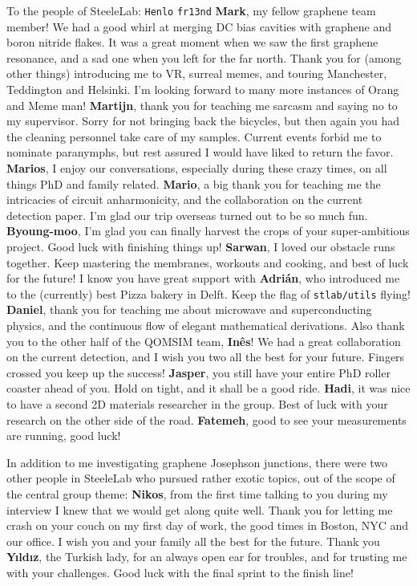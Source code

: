 To the people of SteeleLab:
%
\texttt{Henlo} \texttt{fr13nd} \textbf{Mark}, my fellow graphene team member!
%
We had a good whirl at merging DC bias cavities with graphene and boron nitride flakes.
%
It was a great moment when we saw the first graphene resonance, and a sad one when you left for the far north.
%
Thank you for (among other things) introducing me to VR, surreal memes, and touring Manchester, Teddington and Helsinki.
%
I'm looking forward to many more instances of Orang and Meme man!
%
\textbf{Martijn}, thank you for teaching me sarcasm and saying no to my supervisor.
%
Sorry for not bringing back the bicycles, but then again you had the cleaning personnel take care of my samples.
%
Current events forbid me to nominate paranymphs, but rest assured I would have liked to return the favor.
%
\textbf{Marios}, I enjoy our conversations, especially during these crazy times, on all things PhD and family related.
%
\textbf{Mario}, a big thank you for teaching me the intricacies of circuit anharmonicity, and the collaboration on the current detection paper.
%
I'm glad our trip overseas turned out to be so much fun.
%
\textbf{Byoung-moo}, I'm glad you can finally harvest the crops of your super-ambitious project.
%
Good luck with finishing things up!
%
\textbf{Sarwan}, I loved our obstacle runs together.
%
Keep mastering the membranes, workouts and cooking, and best of luck for the future!
%
I know you have great support with \textbf{Adrián}, who introduced me to the (currently) best Pizza bakery in Delft.
%
Keep the flag of \texttt{stlab/utils} flying!
%
\textbf{Daniel}, thank you for teaching me about microwave and superconducting physics, and the continuous flow of elegant mathematical derivations.
%
Also thank you to the other half of the QOMSIM team, \textbf{Inês}!
%
We had a great collaboration on the current detection, and I wish you two all the best for your future.
%
Fingers crossed you keep up the success!
%
\textbf{Jasper}, you still have your entire PhD roller coaster ahead of you.
%
Hold on tight, and it shall be a good ride.
%
\textbf{Hadi}, it was nice to have a second 2D materials researcher in the group.
%
Best of luck with your research on the other side of the road.
%
\textbf{Fatemeh}, good to see your measurements are running, good luck!

In addition to me investigating graphene Josephson junctions, there were two other people in SteeleLab who pursued rather exotic topics, out of the scope of the central group theme:
%
\textbf{Nikos}, from the first time talking to you during my interview I knew that we would get along quite well.
%
Thank you for letting me crash on your couch on my first day of work, the good times in Boston, NYC and our office.
%
I wish you and your family all the best for the future.
%
Thank you \textbf{Yıldız}, the Turkish lady, for an always open ear for troubles, and for trusting me with your challenges.
%
Good luck with the final sprint to the finish line!

